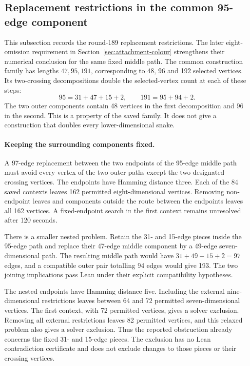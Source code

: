 \documentclass[11pt,a4paper]{article}
\theoremstyle{definition}
\theoremstyle{remark}
\begin{document}
\subsection{Replacement restrictions in the common 95-edge component}
\label{sec:middle-replacements}
This subsection records the round-189 replacement restrictions. The later
eight-omission requirement in Section~\ref{sec:attachment-colour} strengthens
their numerical conclusion for the same fixed middle path.
The common construction family has lengths $47,95,191$, corresponding
to 48, 96 and 192 selected vertices. Its two-crossing decompositions
double the selected-vertex count at each of these steps:
\[
95=31+47+15+2,\qquad 191=95+94+2.
\]
The two outer components contain 48 vertices in the first decomposition
and 96 in the second. This is a property of the saved family. It does
not give a construction that doubles every lower-dimensional snake.

\paragraph{Keeping the surrounding components fixed.}
A 97-edge replacement between the two endpoints of the 95-edge middle
path must avoid every vertex of the two outer paths except the two
designated crossing vertices. The endpoints have Hamming distance three.
Each of the 84 saved contexts leaves 162 permitted eight-dimensional
vertices. Removing non-endpoint leaves and components outside the route
between the endpoints leaves all 162 vertices. A fixed-endpoint search
in the first context remains unresolved after 120 seconds.

There is a smaller nested problem. Retain the 31- and 15-edge pieces
inside the 95-edge path and replace their 47-edge middle component by
a 49-edge seven-dimensional path. The resulting middle path would
have $31+49+15+2=97$ edges, and a compatible outer pair totalling 94
edges would give 193. The two joining implications pass Lean under
their explicit compatibility hypotheses.

The nested endpoints have Hamming distance five. Including the external
nine-dimensional restrictions leaves between 64 and 72 permitted
seven-dimensional vertices. The first context, with 72 permitted
vertices, gives a solver exclusion. Removing all external restrictions
leaves 82 permitted vertices, and this relaxed problem also gives a
solver exclusion. Thus the reported obstruction already concerns the
fixed 31- and 15-edge pieces. The exclusion has no Lean contradiction
certificate and does not exclude changes to those pieces or their
crossing vertices.
\end{document}
